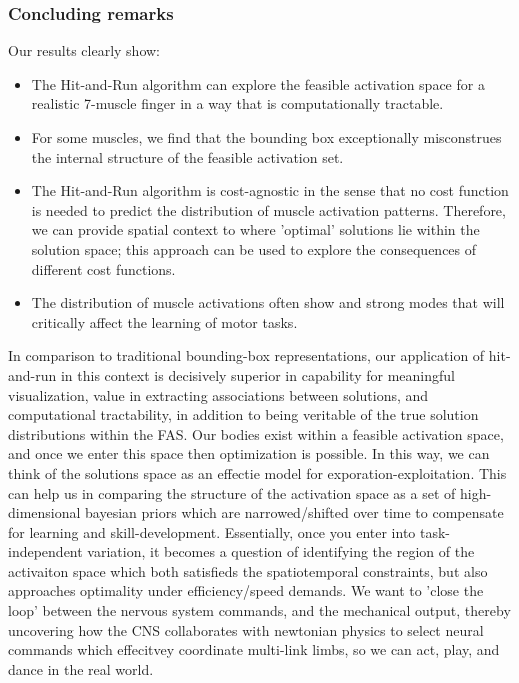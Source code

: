 \subsubsection{Concluding remarks} %
\label{ssub:concluding_remarks}

Our results clearly show:\\

\begin{itemize}
	\item{The Hit-and-Run algorithm can explore the feasible activation space for a realistic 7-muscle finger in a way that is computationally tractable.}
	\item{For some muscles, we find that the bounding box exceptionally misconstrues the internal structure of the feasible activation set.}
	\item{The Hit-and-Run algorithm is cost-agnostic in the sense that no cost function is needed to predict the distribution of muscle activation patterns. Therefore, we can provide spatial context to where 'optimal' solutions lie within the solution space; this approach can be used to explore the consequences of different cost functions.}
	\item{The distribution of muscle activations often show and strong modes that will critically affect the learning of motor tasks.}
\end{itemize}
In comparison to traditional bounding-box representations, our application of hit-and-run in this context is decisively superior in capability for meaningful visualization, value in extracting associations between solutions, and computational tractability, in addition to being veritable of the true solution distributions within the FAS. Our bodies exist within a feasible activation space, and once we enter this space then optimization is possible. In this way, we can think of the solutions space as an effectie model for exporation-exploitation.
This can help us in comparing the structure of the activation space as a set of high-dimensional bayesian priors which are narrowed/shifted over time to compensate for learning and skill-development.
Essentially, once you enter into task-independent variation, it becomes a question of identifying the region of the activaiton space which both satisfieds the spatiotemporal constraints, but also approaches optimality under efficiency/speed demands.
We want to 'close the loop' between the nervous system commands, and the mechanical output, thereby uncovering how the CNS collaborates with newtonian physics to select neural commands which effecitvey coordinate multi-link limbs, so we can act, play, and dance in the real world.
